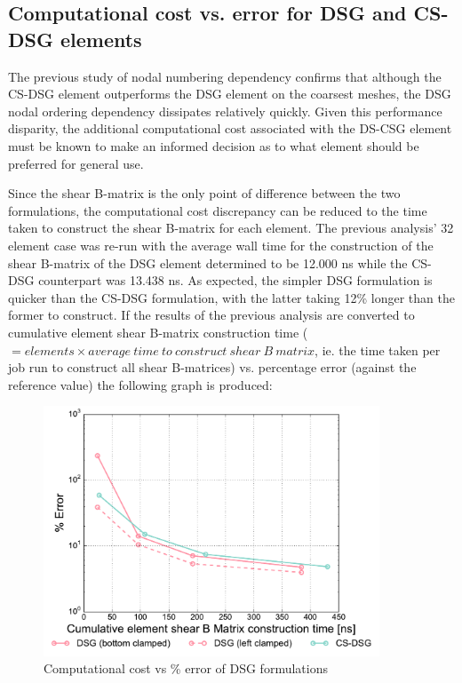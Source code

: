 \subsection{Computational cost vs. error for DSG and CS-DSG elements}
The previous study of nodal numbering dependency confirms that although the CS-DSG element outperforms the DSG element on the coarsest meshes, the DSG nodal ordering dependency dissipates relatively quickly. Given this performance disparity, the additional computational cost associated with the DS-CSG element must be known to make an informed decision as to what element should be preferred for general use. 

Since the shear B-matrix is the only point of difference between the two formulations, the computational cost discrepancy can be reduced to the time taken to construct the shear B-matrix for each element. The previous analysis' 32 element case was re-run with the average wall time for the construction of the shear B-matrix of the DSG element determined to be 12.000 ns while the CS-DSG counterpart was 13.438 ns. As expected, the simpler DSG formulation is quicker than the CS-DSG formulation, with the latter taking 12\% longer than the former to construct. If the results of the previous analysis are converted to cumulative element shear B-matrix construction time ($= elements \times average\ time\ to\ construct\ shear\ B\ matrix$, ie. the time taken per job run to construct all shear B-matrices) vs. percentage error (against the reference value) the following graph is produced:

\begin{figure}[H]
	\centering
	\includegraphics[width=10cm]{images/node_ordering_study_error.pdf}
	\caption{Computational cost vs \% error of DSG formulations}
	\label{fig:Computational cost vs error of DSG formulations}
\end{figure}

